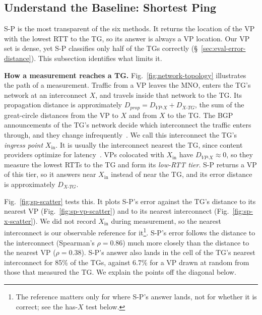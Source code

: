 
\subsection{Understand the Baseline: Shortest Ping}
\label{sec:err-characterization-sp}

S-P is the most transparent of the six methods. It returns the location of the VP with the lowest RTT to the TG, so its answer is always a VP location. Our VP set is dense, yet S-P classifies only half of the TGs correctly (\S~\ref{sec:eval-error-distance}). This subsection identifies what limits it.

\noindent \textbf{How a measurement reaches a TG.} Fig.~\ref{fig:network-topology} illustrates the path of a measurement. Traffic from a VP leaves the MNO, enters the TG's network at an interconnect $X$, and travels inside that network to the TG. Its propagation distance is approximately $D_{prop} = D_{VP\text{-}X} + D_{X\text{-}TG}$, the sum of the great-circle distances from the VP to $X$ and from $X$ to the TG. The BGP announcements of the TG's network decide which interconnect the traffic enters through, and they change infrequently~. We call this interconnect the TG's \emph{ingress point} $X_{\mathrm{in}}$. It is usually the interconnect nearest the TG, since content providers optimize for latency~. VPs colocated with $X_{\mathrm{in}}$ have $D_{VP\text{-}X} \approx 0$, so they measure the lowest RTTs to the TG and form its \emph{low-RTT tier}. S-P returns a VP of this tier, so it answers near $X_{\mathrm{in}}$ instead of near the TG, and its error distance is approximately $D_{X\text{-}TG}$.

Fig.~\ref{fig:sp-scatter} tests this. It plots S-P's error against the TG's distance to its nearest VP (Fig.~\ref{fig:sp-vp-scatter}) and to its nearest interconnect (Fig.~\ref{fig:sp-x-scatter}). We did not record $X_{\mathrm{in}}$ during measurement, so the nearest interconnect is our observable reference for it\footnote{The reference matters only for where S-P's answer lands, not for whether it is correct; see the has-$X$ test below.}. S-P's error follows the distance to the interconnect (Spearman's $\rho = 0.86$) much more closely than the distance to the nearest VP ($\rho = 0.38$). S-P's answer also lands in the cell of the TG's nearest interconnect for 85\% of the TGs, against 6.7\% for a VP drawn at random from those that measured the TG. We explain the points off the diagonal below. 

